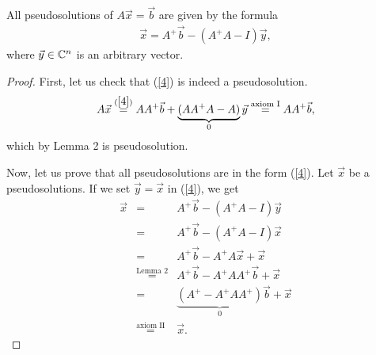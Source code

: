    \begin{proposition}{}{}
        All pseudosolutions of $A\vec{x} = \vec{b}$ are given by the formula
        \begin{eqnarray}
            \vec{x} = A^+\vec{b} - (A^+A-I)\vec{y},\label{4}
        \end{eqnarray}
        where $\vec{y} \in \mathbb{C}^n$ is an arbitrary vector.
    \end{proposition}
    \begin{proof}
        First, let us check that (\ref{4}) is indeed a pseudosolution. 
        \[
            A\vec{x}
            \stackrel{(\ref{4})}{=}AA^+\vec{b}+\underbrace{(AA^+A-A)}_{0}\vec{y}
            \stackrel{\text{axiom I}}{=}AA^+\vec{b},
        \]
        which by Lemma 2 is pseudosolution.

        Now, let us prove that all pseudosolutions are in the form (\ref{4}). Let $\vec{x}$ be a pseudosolutions. If we set $\vec{y}=\vec{x}$ in (\ref{4}), we get
        \begin{eqnarray}
             \vec{x}&=&A^+\vec{b} - (A^+A-I)\vec{y}\nonumber\\
             &=&A^+\vec{b} - (A^+A-I)\vec{x}\nonumber\\
             &=&A^+\vec{b} -A^+A\vec{x}+\vec{x}\nonumber\\
             &\stackrel{\text{Lemma 2}}{=}&A^+\vec{b} -A^+AA^+\vec{b}+\vec{x}\nonumber\\
             &=&\underbrace{(A^+ -A^+AA^+)}_{0}\vec{b}+\vec{x}\nonumber\\
            &\stackrel{\text{axiom II}}{=}&\vec{x}.\nonumber
        \end{eqnarray}
    \end{proof}
    
